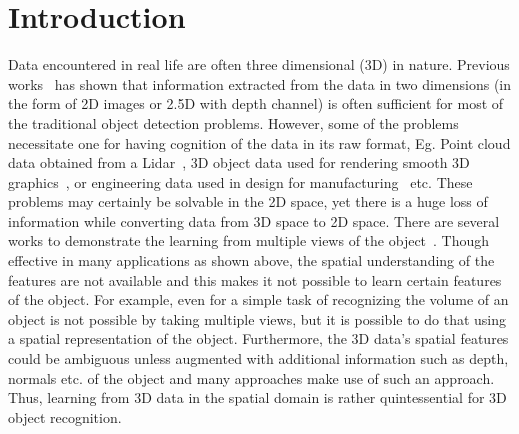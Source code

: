 \documentclass[10pt,letterpaper]{article}
\begin{document}

\section{Introduction}
\label{Sec:Introduction}
Data encountered in real life are often three dimensional (3D) in nature. Previous works~\citep{wu20153d,su15mvcnn} has shown that information extracted from the data in two dimensions (in the form of 2D images or 2.5D with depth channel) is often sufficient for most of the traditional object detection problems. However, some of the problems necessitate one for having cognition of the data in its raw format, Eg. Point cloud data obtained from a Lidar~\citep{qi2017pointnet++}, 3D object data used for rendering smooth 3D graphics~\citep{tatarchenko2017octree}, or engineering data used in design for manufacturing~\citep{GHADAI2018263} etc.  These problems may certainly be solvable in the 2D space, yet there is a huge loss of information while converting data from 3D space to 2D space. There are several works to demonstrate the learning from multiple views of the object~\citep{li2018sonet, kanezaki2016rotationnet, SFIKAS2018208, qi2016volumetric}. Though effective in many applications as shown above, the spatial understanding of the features are not available and this makes it not possible to learn certain features of the object. For example, even for a simple task of recognizing the volume of an object is not possible by taking multiple views, but it is possible to do that using a spatial representation of the object. Furthermore, the 3D data's spatial features could be ambiguous unless augmented with additional information such as depth, normals etc.  of the object and many approaches make use of such an approach. Thus, learning from 3D data in the spatial domain is rather quintessential for 3D object recognition.
\end{document}
